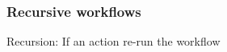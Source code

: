 \begin{frame}
    \frametitle{Recursive workflows}
    \danger Recursion: If an action re-run the workflow
\end{frame}

